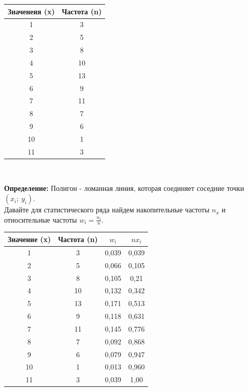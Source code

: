 \documentclass[12pt]{article}
\begin{document}
\begin{tabular}{ |c|c| }
    \hline
    Значенеия (x) & Частота (n)\\
    \hline
    1 & 3 \\
    \hline
    2 & 5 \\
    \hline
    3 & 8 \\
    \hline
    4 & 10 \\
    \hline
    5 & 13 \\
    \hline
    6 & 9 \\
    \hline
    7 & 11 \\
    \hline
    8 & 7 \\
    \hline
    9 & 6 \\
    \hline
    10 & 1 \\
    \hline
    11 & 3 \\
    \hline
\end{tabular}\\
\vspace{5mm}
\raggedright
\textbf{Определение:} Полигон - ломанная линия, которая соединяет соседние точки $(x_i;\ y_i)$.\\
\vspace{5mm}
Давайте для статистического ряда найдем накопительные частоты $n_x$ и относительные частоты $w_i = \frac{n_i}{n}$.\\
\vspace{5mm}
\centering
\begin{tabular}{ |c|c|c|c| }
  \hline
  Значение (x) & Частота (n) & $w_i$ & $nx_i$ \\
  \hline
  1 & 3 & 0,039 & 0,039\\
  \hline
  2 & 5 & 0,066 & 0,105\\
  \hline
  3 & 8 & 0,105 & 0,21 \\
  \hline
  4 & 10 & 0,132 & 0,342\\
  \hline
  5 & 13 & 0,171 & 0,513\\
  \hline
  6 & 9 & 0,118 & 0,631\\
  \hline
  7 & 11 & 0,145 & 0,776\\
  \hline
  8 & 7 & 0,092 & 0,868\\
  \hline
  9 & 6 & 0,079 & 0,947\\
  \hline
  10 & 1 & 0,013 & 0,960\\
  \hline
  11 & 3 & 0,039 & 1,00\\
  \hline 
\end{tabular}
\vspace{5mm}
\end{document}
